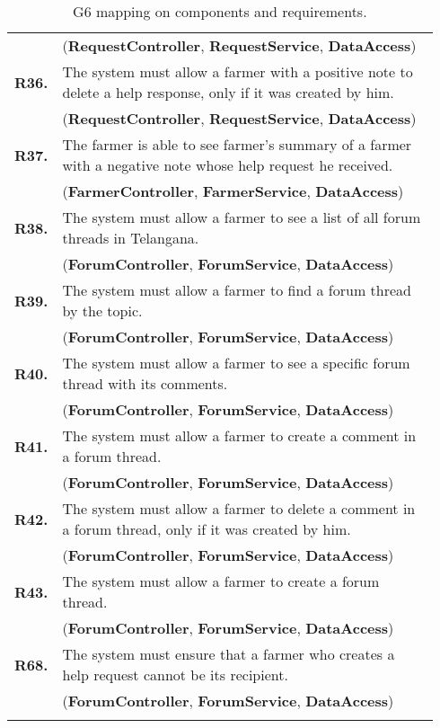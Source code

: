 \begin{longtable}{p{0.06\linewidth} p{0.88\linewidth}}
	& (\textbf{RequestController}, \textbf{RequestService}, \textbf{DataAccess})\\
	\textbf{R36.} & The system must allow a farmer with a positive note to delete a help response, only if it was created by him.\\
	& (\textbf{RequestController}, \textbf{RequestService}, \textbf{DataAccess})\\
	\textbf{R37.} & The farmer is able to see farmer's summary of a farmer with a negative note whose help request he received. \\
	& (\textbf{FarmerController}, \textbf{FarmerService}, \textbf{DataAccess})\\
	\textbf{R38.} & The system must allow a farmer to see a list of all forum threads in Telangana.\\
	& (\textbf{ForumController}, \textbf{ForumService}, \textbf{DataAccess})\\
	\textbf{R39.} & The system must allow a farmer to find a forum thread by the topic.\\
	& (\textbf{ForumController}, \textbf{ForumService}, \textbf{DataAccess})\\
	\textbf{R40.} & The system must allow a farmer to see a specific forum thread with its comments.\\
	& (\textbf{ForumController}, \textbf{ForumService}, \textbf{DataAccess})\\
	\textbf{R41.} & The system must allow a farmer to create a comment in a forum thread.\\
	& (\textbf{ForumController}, \textbf{ForumService}, \textbf{DataAccess})\\
	\textbf{R42.} & The system must allow a farmer to delete a comment in a forum thread, only if it was created by him.\\
	& (\textbf{ForumController}, \textbf{ForumService}, \textbf{DataAccess})\\
	\textbf{R43.} & The system must allow a farmer to create a forum thread.\\
	& (\textbf{ForumController}, \textbf{ForumService}, \textbf{DataAccess})\\
	\textbf{R68.} & The system must ensure that a farmer who creates a help request cannot be its recipient.\\
	& (\textbf{ForumController}, \textbf{ForumService}, \textbf{DataAccess})\\
	
    \bottomrule
    \caption{G6 mapping on components and requirements.}
\end{longtable}

